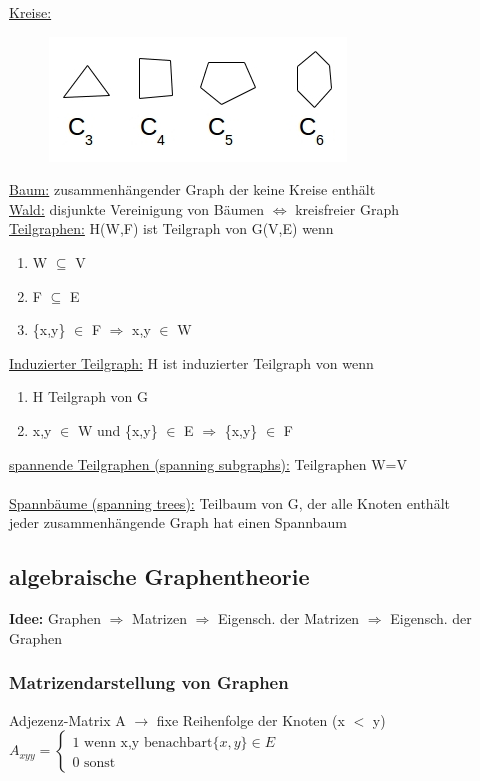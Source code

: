 \underline{Kreise:}
\begin{figure}[htp]
\centering
\includegraphics[scale=1]{lectures/161021/pix/pic10.jpg}
\end{figure}

\underline{Baum:} zusammenhängender Graph der keine Kreise enthält\\
\underline{Wald:} disjunkte Vereinigung von Bäumen $\Leftrightarrow$ kreisfreier Graph\\
\underline{Teilgraphen:} H(W,F) ist Teilgraph von G(V,E) wenn
\begin{enumerate}
	\item W $\subseteq$ V
	\item F $\subseteq$ E
	\item \{x,y\} $\in$ F $\Rightarrow$ x,y $\in$ W
\end{enumerate}

\underline{Induzierter Teilgraph:} H ist induzierter Teilgraph von wenn
\begin{enumerate}
	\item H Teilgraph von G
	\item x,y $\in$ W und \{x,y\} $\in$ E $\Rightarrow$ \{x,y\} $\in$ F
\end{enumerate}

\underline{spannende Teilgraphen (spanning subgraphs):} Teilgraphen W=V
\\\\
\underline{Spannbäume (spanning trees):} Teilbaum von G, der alle Knoten enthält\\
jeder zusammenhängende Graph hat einen Spannbaum

\subsection{algebraische Graphentheorie}
\textbf{Idee:} Graphen $\Rightarrow$ Matrizen $\Rightarrow$ Eigensch. der Matrizen $\Rightarrow$ Eigensch. der Graphen
\subsubsection{Matrizendarstellung von Graphen}
Adjezenz-Matrix A $\rightarrow$ fixe Reihenfolge der Knoten (x $<$ y)\\
$A_{xyy}=
	\begin{cases}
		\text{1 wenn x,y benachbart} \{x,y\} \in E\\
		\text{0 sonst}
	\end{cases}
$


